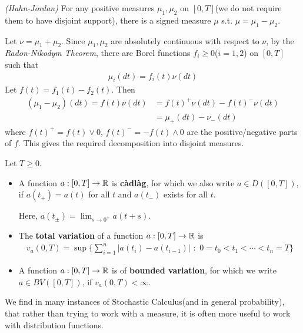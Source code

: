 \documentclass[12pt,a4paper]{article}
\newenvironment{proof}
{\begin{changemargin}{0.5cm}{0.5cm} 
	}%
	{\end{changemargin}
}
\renewenvironment{i}
{\begin{itemize} 
	}%
	{\end{itemize}
}
\newenvironment{p}
{\begin{proof} 
	}%
	{\end{proof}
}
\begin{document}
\prop \emph{(Hahn-Jordan)} For any positive measures $\mu_1, \mu_2$ on $[0, T]$(we do not require them to have disjoint support), there is a signed measure $\mu$ s.t. $\mu = \mu_1 - \mu_2$.
\begin{p}
\pf Let $\nu = \mu_1 + \mu_2$. Since $\mu_1,\mu_2$ are absolutely continuous with respect to $\nu$, by the \emph{Radon-Nikodym Theorem}, there are Borel functions $f_i \geq 0$($i= 1,2$) on $[0, T]$ such that 
\begin{align*}
\mu_i (dt) = f_i(t) \nu(dt)
\end{align*}
Let $f(t) = f_1(t)  - f_2(t)$. Then
\begin{align*}
(\mu_1 - \mu_2) (dt) = f(t) \nu (dt) & = f(t)^+ \nu(dt) - f(t)^- \nu(dt) \\
& = \mu_+(dt) - \nu_-(dt)
\end{align*}
where $f(t)^+ = f(t) \vee 0$, $f(t)^- = -f(t) \wedge 0$ are the positive/negative parts of $f$. This gives the required decomposition into disjoint measures.

\eop 
\end{p}
\s

 Let $T \geq 0$.
\begin{i}
\item A function $a: [0, T] \rightarrow \mathbb{R}$ is \textbf{c\`{a}dl\`{a}g}, for which we also write $a\in D([0, T])$, if $a(t_+)  = a(t)$ for all $t$ and $a(t_-)$ exists for all $t$.

\quad Here, $a(t_{\pm}) = \lim_{s\rightarrow 0^{\pm}} a(t+s)$.
\item The \textbf{total variation} of a function $a:[0, T] \rightarrow \mathbb{R}$ is
\begin{align*}
v_a(0, T) = \sup \Big\{ \sum_{i=1}^n |a(t_i) - a(t_{i-1})|\,\, : \,\, 0 = t_0<t_1<\cdots<t_n=T \Big\}
\end{align*}
\item A function $a:[0, T] \rightarrow \mathbb{R}$ is of \textbf{bounded variation}, for which we write $a\in BV([0,T])$, if $v_a(0,T) < \infty$. 
\end{i}
\s

We find in many instances of Stochastic Calculus(and in general probability), that rather than trying to work with a measure, it is often more useful to work with distribution functions.
\s
\end{document}
